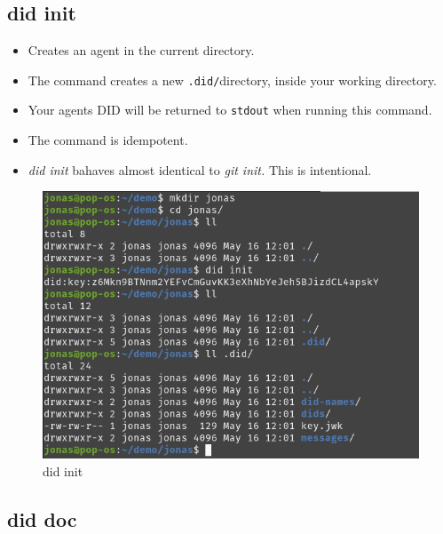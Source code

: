 \hypertarget{did-init}{%
\subsection{did init}\label{did-init}}

\begin{itemize}
\tightlist
\item
  Creates an agent in the current directory.
\item
  The command creates a new \lstinline!.did/!directory,
  inside your working directory.
\item
  Your agents DID will be returned to \lstinline!stdout!
  when running this command.
\item
  The command is idempotent.
\item
  \emph{did init} bahaves almost identical to \emph{git init.} This is
  intentional.
\end{itemize}

\begin{figure}
\centering
\includegraphics[width=\textwidth]{User Interface f8759a9462b24d5f95cf6123d68b89ea/Untitled 1.png}
\caption{did init}
\end{figure}



\pagebreak



\hypertarget{did-doc}{%
\subsection{did doc}\label{did-doc}}


